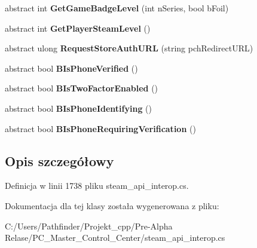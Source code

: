 \begin{DoxyCompactItemize}
\item 
\mbox{\label{class_valve_1_1_steamworks_1_1_i_steam_user_ae64cf51b62da6a2ff243c359db757dea}} 
abstract int {\bfseries Get\+Game\+Badge\+Level} (int n\+Series, bool b\+Foil)
\item 
\mbox{\label{class_valve_1_1_steamworks_1_1_i_steam_user_ab48894c7ab54ad8f4e1721e5379ac36a}} 
abstract int {\bfseries Get\+Player\+Steam\+Level} ()
\item 
\mbox{\label{class_valve_1_1_steamworks_1_1_i_steam_user_ae5e14eb42ccd9cfce1ac88f7c68b0a75}} 
abstract ulong {\bfseries Request\+Store\+Auth\+U\+RL} (string pch\+Redirect\+U\+RL)
\item 
\mbox{\label{class_valve_1_1_steamworks_1_1_i_steam_user_ad3239949b1479ed48cb9e3e17a74f689}} 
abstract bool {\bfseries B\+Is\+Phone\+Verified} ()
\item 
\mbox{\label{class_valve_1_1_steamworks_1_1_i_steam_user_ab60723eacfedc2548976a45fbe71699d}} 
abstract bool {\bfseries B\+Is\+Two\+Factor\+Enabled} ()
\item 
\mbox{\label{class_valve_1_1_steamworks_1_1_i_steam_user_a51a78b57c4bc64eba7f1003e957385e6}} 
abstract bool {\bfseries B\+Is\+Phone\+Identifying} ()
\item 
\mbox{\label{class_valve_1_1_steamworks_1_1_i_steam_user_aa6d6a391f1dd677ea15a85e72f273be1}} 
abstract bool {\bfseries B\+Is\+Phone\+Requiring\+Verification} ()
\end{DoxyCompactItemize}


\subsection{Opis szczegółowy}


Definicja w linii 1738 pliku steam\+\_\+api\+\_\+interop.\+cs.



Dokumentacja dla tej klasy została wygenerowana z pliku\+:\begin{DoxyCompactItemize}
\item 
C\+:/\+Users/\+Pathfinder/\+Projekt\+\_\+cpp/\+Pre-\/\+Alpha Relase/\+P\+C\+\_\+\+Master\+\_\+\+Control\+\_\+\+Center/steam\+\_\+api\+\_\+interop.\+cs\end{DoxyCompactItemize}

